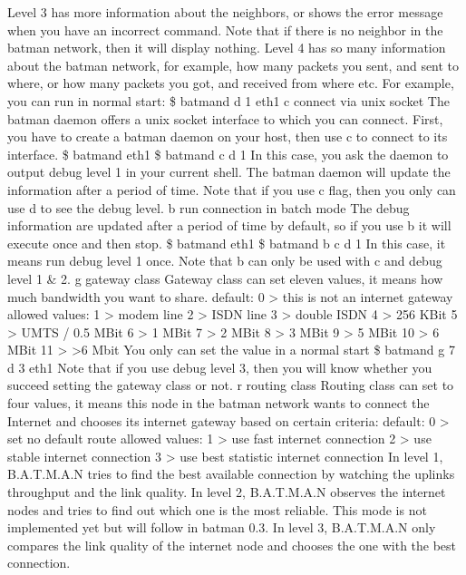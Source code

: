\documentclass[
	12pt,
	a4paper,
	twoside,
	english,
	headsepline,
	footnosepline,
	automark,
	normalheadings,
	openany,
	cleardoubleplain,
	abstracton,
	idxtotoc,
	liststotoc,
	bibtotoc,
 	BCOR8mm,
]{scrartcl}
\begin{document}
Level 3 has more information about the neighbors, or shows the error message when  you  have an incorrect command. Note that if there is no neighbor in the batman network, then it  will display nothing. Level 4 has so many information about the batman network, for example, how many packets  you sent, and sent to where, or how many packets you got, and received from where etc.  For example, you can run in normal start: \$ batmand  d 1 eth1  c connect via unix socket The batman daemon offers a unix socket interface to which you can connect. First, you have to create a batman daemon on your host, then use  c to connect to its  interface.
\$ batmand eth1 \$ batmand   c  d 1  In this case, you ask the daemon to output debug level 1 in your current shell. The batman  daemon will update the information after a period of time. Note that if you use  c flag, then you only can use  d to see the debug level.  b run connection in batch mode The debug information are updated  after a  period of time by default, so if you use  b it will  execute once and then stop.  \$ batmand eth1 \$ batmand   b  c  d 1  In this case, it means run debug level 1 once.
Note that  b can only be used with  c and debug level 1 \& 2.   g gateway class Gateway class can set eleven values, it means how much bandwidth you want to share.           default:            0  > this is not an internet gateway           allowed values:  1  > modem line                               2  > ISDN line                             3  > double ISDN                                4  > 256 KBit                               5  > UMTS / 0.5 MBit                             6  > 1 MBit                             7  > 2 MBit                             8  > 3 MBit                             9  > 5 MBit                            10  > 6 MBit                            11  > >6 Mbit You only can set the value in a normal start \$ batmand  g 7  d 3  eth1 Note that if you use debug level 3, then you will know whether you succeed setting the  gateway class or not.  r routing class Routing class can set to four values, it means this node in the batman network wants to  connect the Internet and chooses its internet gateway based on certain criteria:           default:           0  > set no default route           allowed values:  1  > use fast internet connection                              2  > use stable internet connection                              3  > use best statistic internet connection In level 1, B.A.T.M.A.N tries to find the best available connection by watching the uplinks  throughput and the link quality. In level 2, B.A.T.M.A.N observes the internet nodes and tries to find out which one is the  most reliable. This mode is not implemented yet but will follow in batman 0.3. In level 3, B.A.T.M.A.N only compares the link quality of the internet node and chooses the  one with the best connection.
\end{document}
